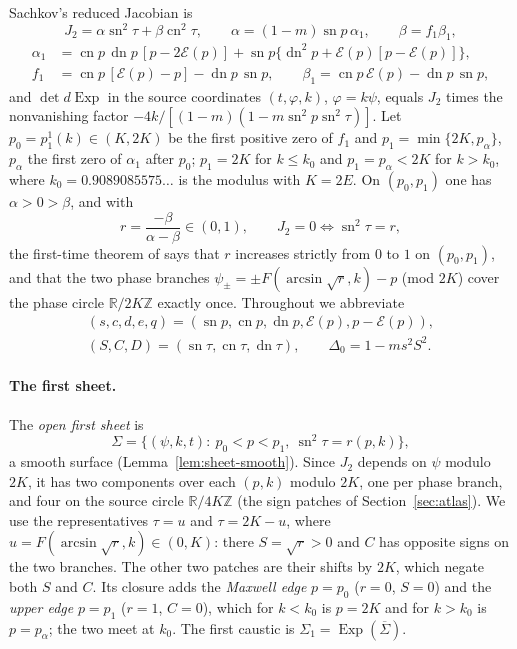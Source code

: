 \documentclass[11pt]{article}
\theoremstyle{remark}
\newcommand{\sn}{\operatorname{sn}}
\newcommand{\cn}{\operatorname{cn}}
\newcommand{\dn}{\operatorname{dn}}
\newcommand{\epsi}{\mathcal{E}}
\newcommand{\Exp}{\operatorname{Exp}}
\begin{document}
Sachkov's reduced Jacobian is
\begin{equation}\label{eq:j2}
 J_2=\alpha\sn^2\tau+\beta\cn^2\tau,\qquad
 \alpha=(1-m)\sn p\,\alpha_1,\qquad \beta=f_1\beta_1,
\end{equation}
\begin{equation}\label{eq:coeffs}
 \begin{aligned}
 \alpha_1&=\cn p\,\dn p\,[p-2\epsi(p)]+\sn p\{\dn^2p+\epsi(p)[p-\epsi(p)]\},\\
 f_1&=\cn p\,[\epsi(p)-p]-\dn p\,\sn p,\qquad
 \beta_1=\cn p\,\epsi(p)-\dn p\,\sn p,
 \end{aligned}
\end{equation}
and $\det d\Exp$ in the source coordinates $(t,\varphi,k)$, $\varphi=k\psi$, equals $J_2$
times the nonvanishing factor $-4k/[(1-m)(1-m\sn^2p\sn^2\tau)]$.  Let
$p_0=p_1^1(k)\in(K,2K)$ be the first positive zero of $f_1$ and
$p_1=\min\{2K,p_\alpha\}$, $p_\alpha$ the first zero of $\alpha_1$ after
$p_0$; $p_1=2K$ for $k\le k_0$ and $p_1=p_\alpha<2K$ for $k>k_0$, where
$k_0=0.9089085575\ldots$ is the modulus with $K=2E$.  On $(p_0,p_1)$ one has
$\alpha>0>\beta$, and with
\begin{equation}\label{eq:r}
 r=\frac{-\beta}{\alpha-\beta}\in(0,1),\qquad
 J_2=0\iff\sn^2\tau=r,
\end{equation}
the first-time theorem of \cite{SE2FirstConjugate} says that $r$ increases
strictly from $0$ to $1$ on $(p_0,p_1)$, and that the two phase branches
$\psi_\pm=\pm F(\arcsin\sqrt r,k)-p$ (mod $2K$) cover the phase circle
$\mathbb R/2K\mathbb Z$ exactly once.  Throughout we abbreviate
\begin{equation}\label{eq:abbrev}
 \begin{gathered}
 (s,c,d,e,q)=(\sn p,\cn p,\dn p,\epsi(p),p-\epsi(p)),\\
 (S,C,D)=(\sn\tau,\cn\tau,\dn\tau),\qquad \Delta_0=1-ms^2S^2.
 \end{gathered}
\end{equation}

\paragraph{The first sheet.}  The \emph{open first sheet} is
\[
 \Sigma=\{(\psi,k,t):\ p_0<p<p_1,\ \sn^2\tau=r(p,k)\},
\]
a smooth surface (Lemma~\ref{lem:sheet-smooth}).  Since $J_2$ depends on
$\psi$ modulo $2K$, it has two components over each $(p,k)$ modulo $2K$, one
per phase branch, and four on the source circle $\mathbb R/4K\mathbb Z$ (the
sign patches of Section~\ref{sec:atlas}).  We use the representatives
$\tau=u$ and $\tau=2K-u$, where $u=F(\arcsin\sqrt r,k)\in(0,K)$:
there $S=\sqrt r>0$ and $C$ has opposite signs on the two branches.
The other two patches are their shifts by $2K$, which negate both $S$
and $C$.  Its closure adds the \emph{Maxwell edge}
$p=p_0$ ($r=0$, $S=0$) and the \emph{upper edge} $p=p_1$ ($r=1$, $C=0$),
which for $k<k_0$ is $p=2K$ and for $k>k_0$ is $p=p_\alpha$; the two meet
at $k_0$.  The first caustic is $\Sigma_1=\Exp(\overline\Sigma)$.
\end{document}
